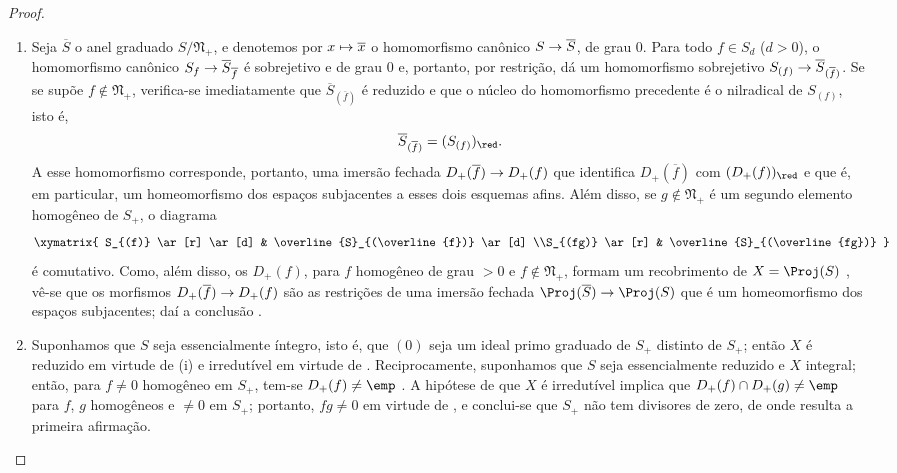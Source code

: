 \documentclass[oneside,10pt]{amsart}
\makeatletter
\newcommand{\ega@arrow}[2]{\mathchoice{#1}{#2}{#2}{#2}}
\let\ega@shortmapsto\mapsto
\renewcommand{\to}{\ega@arrow{\longrightarrow}{\rightarrow}}
\renewcommand{\mapsto}{\ega@arrow{\longmapsto}{\ega@shortmapsto}}
\makeatother
\begin{document}
\begin{proof}
\medskip\noindent
\begin{enumerate}
  \item[\rm(i)] Seja $\overline{S}$ o anel graduado $S/\mathfrak{N}_+$, e denotemos por $x\mapsto\overline{x}$ o homomorfismo canônico $S\to\overline{S}$, de grau $0$.
  Para todo $f\in S_d$ ($d>0$), o homomorfismo canônico $S_f\to\overline{S}_{\overline{f}}$  é sobrejetivo e de grau $0$ e, portanto, por restrição, dá um homomorfismo sobrejetivo $S_{(f)}\to\overline{S}_{(\overline{f})}$.
  Se se supõe $f\notin\mathfrak{N}_+$, verifica-se imediatamente que $\overline{S}_{(\overline{f})}$ é reduzido e que o núcleo do homomorfismo precedente é o nilradical de $S_{(f)}$, isto é,
  \[
    \overline{S}_{(\overline{f})}=(S_{(f)})_\red.
  \]
  A esse homomorfismo corresponde, portanto, uma imersão fechada $D_+(\overline{f})\to D_+(f)$ que identifica $D_+(\overline{f})$ com $(D_+(f))_\red$  e que é, em particular, um homeomorfismo dos espaços subjacentes a esses dois esquemas afins.
  Além disso, se $g\notin\mathfrak{N}_+$ é um segundo elemento homogêneo de $S_+$, o diagrama
  \[
    \xymatrix{
      S_{(f)} \ar[r] \ar[d]
      & \overline{S}_{(\overline{f})} \ar[d]
    \\S_{(fg)} \ar[r]
      & \overline{S}_{(\overline{fg})}
    }
  \]
  é comutativo.
  Como, além disso, os $D_+(f)$, para $f$ homogêneo de grau $>0$ e $f\notin\mathfrak{N}_+$, formam um recobrimento de $X=\Proj(S)$ , vê-se que os morfismos $D_+(\overline{f})\to D_+(f)$ são as restrições de uma imersão fechada $\Proj(\overline{S})\to\Proj(S)$ que é um homeomorfismo dos espaços subjacentes; daí a conclusão .
  \item[\rm(ii)] Suponhamos que $S$ seja essencialmente íntegro, isto é, que $(0)$ seja um ideal primo graduado de $S_+$ distinto de $S_+$; então $X$ é reduzido em virtude de (i) e irredutível em virtude de .
  Reciprocamente, suponhamos que $S$ seja essencialmente reduzido e $X$ integral; então, para $f\neq0$ homogêneo em $S_+$, tem-se $D_+(f)\neq\emp$ .
  A hipótese de que $X$ é irredutível implica que $D_+(f)\cap D_+(g)\neq\emp$ para $f$, $g$ homogêneos e $\neq0$ em $S_+$; portanto, $fg\neq0$ em virtude de , e conclui-se que $S_+$ não tem divisores de zero, de onde resulta a primeira afirmação.
\end{enumerate}
\end{proof}
\end{document}
